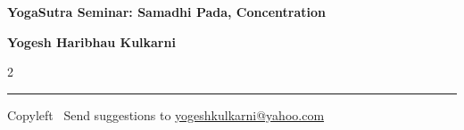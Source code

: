 \documentclass[9pt,a4paper,landscape]{article}
\begin{document}
\footnotesize

\begin{center}
\Large{\textbf{YogaSutra Seminar: Samadhi Pada, Concentration}}

\small{\textbf{Yogesh Haribhau Kulkarni}}
\end{center}

\begin{multicols}{2}

\end{multicols}

\rule{\linewidth}{0.25pt}
\scriptsize
Copyleft \textcopyleft\  Send suggestions to
\href{http://www.yogeshkulkarni.com}{yogeshkulkarni@yahoo.com}
\end{document}
